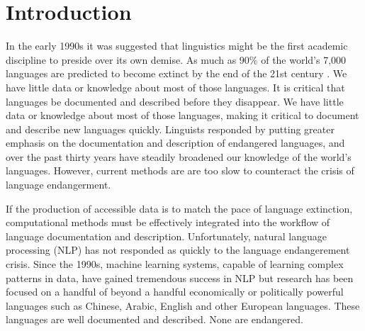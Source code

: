 \chapter{Introduction}
\label{introchap}

In the early 1990s it was suggested that linguistics might be the first academic discipline to preside over its own demise. As much as 90\% of the world’s 7,000 languages are predicted to become extinct by the end of the 21st century \citep{krauss_worlds_1992,krauss_keynote--mass_2007,campbell_new_2013}. We have little data or knowledge about most of those languages. It is critical that languages  be documented and described before they disappear. %
We have little data or knowledge about most of those languages, making it critical to document and describe new languages quickly. Linguists responded by putting greater emphasis on the documentation and description of endangered languages, and over the past thirty years have steadily broadened our knowledge of the world's languages. However, current methods are
are too slow to counteract the crisis of language endangerment. 

If the production of accessible data is to match the pace of language extinction, computational methods must be effectively integrated into the workflow of language documentation and description. Unfortunately, natural language processing (NLP) has not responded as quickly to the language endangerement crisis. Since the 1990s, machine learning systems, capable of learning complex patterns in data, have gained tremendous success in NLP
but research has been focused on a handful of beyond a handful economically or politically powerful languages such as Chinese, Arabic, English and other European languages. These languages are well documented and described. None 
are endangered.%

